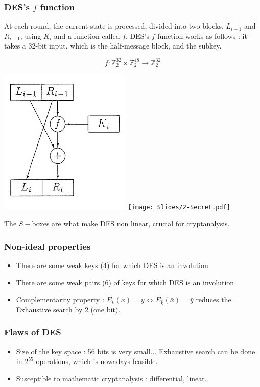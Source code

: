 \documentclass[../Cryptography.tex]{subfiles}
\begin{document}
\subsubsection{DES's $f$ function}
At each round, the current state is processed, divided into two blocks, $L_{i-1}$ and $R_{i-1}$, using $K_{i}$ and a function called $f$. DES's $f$ function works as follows : it takes a 32-bit input, which is the half-message block, and the subkey.

$$f : \mathbb{Z}_2 ^{32} \times \mathbb{Z}_2 ^{48} \rightarrow \mathbb{Z}_2 ^{32}$$
\begin{center}
    \includegraphics[height=7cm]{images/2-DES-feistel.png}
    \texttt{[image: Slides/2-Secret.pdf]}
\end{center}
The $S-$boxes are what make DES non linear, crucial for cryptanalysis.

\subsubsection{Non-ideal properties}
\begin{itemize}
    \item There are some weak keys (4) for which DES is an involution
    \item There are some weak pairs (6) of keys for which DES is an involution 
    \item Complementarity property : $ E_k(x) = y \iff E_{\bar{k}}(\bar x) = \bar y$ reduces the Exhaustive search by 2 (one bit).
\end{itemize}
\subsubsection{Flaws of DES}
\begin{itemize}
    \item Size of the key space : 56 bits is very small... Exhaustive search can be done in $2^{55}$ operations, which is nowadays feasible.
    \item Susceptible to mathematic cryptanalysis : differential, linear. 
\end{itemize}
\end{document}
